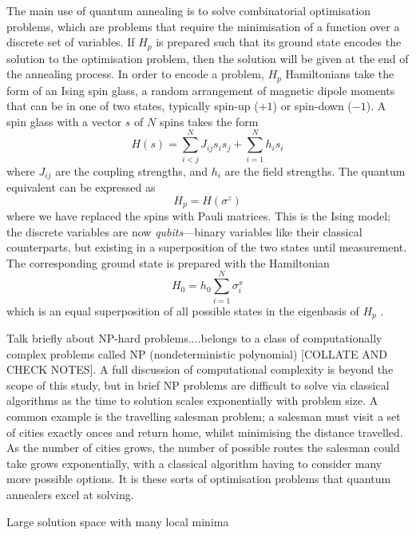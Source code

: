 \documentclass[12pt]{article}
\theoremstyle{definition}
\begin{document}
The main use of quantum annealing is to solve combinatorial optimisation problems, which are problems that require the minimisation of a function over a discrete set of variables. If $H_p$ is prepared such that its ground state encodes the solution to the optimisation problem, then the solution will be given at the end of the annealing process. In order to encode a problem, $H_p$ Hamiltonians take the form of an Ising spin glass, a random arrangement of magnetic dipole moments that can be in one of two states, typically spin-up ($+1$) or spin-down ($-1$). A spin glass with a vector $s$ of $N$ spins takes the form
\begin{equation}
    H(s) = \sum_{i<j}^{N}J_{ij}s_i s_j + \sum_{i=1}^{N}h_i s_i
    \label{eq:ising}
\end{equation}
where $J_{ij}$ are the coupling strengths, and $h_i$ are the field strengths. The quantum equivalent can be expressed as
\begin{equation}
    H_p = H(\sigma^z)
\end{equation}
where we have replaced the spins with Pauli matrices. This is the Ising model; the discrete variables are now \emph{qubits}---binary variables like their classical counterparts, but existing in a superposition of the two states until measurement. The corresponding ground state is prepared with the Hamiltonian
\begin{equation}
    H_0 = h_0\sum_{i=1}^{N}\sigma_i^x
\end{equation}
which is an equal superposition of all possible states in the eigenbasis of $H_p$ .

Talk briefly about NP-hard problems....belongs to a class of computationally complex problems called NP (nondeterministic polynomial) [COLLATE AND CHECK NOTES]. A full discussion of computational complexity is beyond the scope of this study, but in brief NP problems are difficult to solve via classical algorithms as the time to solution scales exponentially with problem size. A common example is the travelling salesman problem; a salesman must visit a set of cities exactly onces and return home, whilst minimising the distance travelled. As the number of cities grows, the number of possible routes the salesman could take grows exponentially, with a classical algorithm having to consider many more possible options. It is these sorts of optimisation problems that quantum annealers excel at solving.

Large solution space with many local minima
\end{document}
